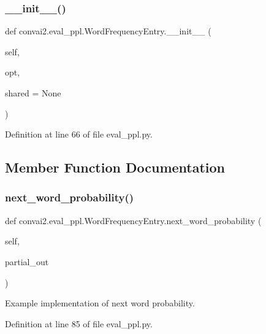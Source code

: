 \subsubsection{\texorpdfstring{\+\_\+\+\_\+init\+\_\+\+\_\+()}{\_\_init\_\_()}}
{\footnotesize\ttfamily def convai2.\+eval\+\_\+ppl.\+Word\+Frequency\+Entry.\+\_\+\+\_\+init\+\_\+\+\_\+ (\begin{DoxyParamCaption}\item[{}]{self,  }\item[{}]{opt,  }\item[{}]{shared = {\ttfamily None} }\end{DoxyParamCaption})}



Definition at line 66 of file eval\+\_\+ppl.\+py.



\subsection{Member Function Documentation}
\mbox{\label{classconvai2_1_1eval__ppl_1_1WordFrequencyEntry_a8dace8d727764609e2cc305e79fab2a5}} 
\subsubsection{\texorpdfstring{next\+\_\+word\+\_\+probability()}{next\_word\_probability()}}
{\footnotesize\ttfamily def convai2.\+eval\+\_\+ppl.\+Word\+Frequency\+Entry.\+next\+\_\+word\+\_\+probability (\begin{DoxyParamCaption}\item[{}]{self,  }\item[{}]{partial\+\_\+out }\end{DoxyParamCaption})}

\begin{DoxyVerb}Example implementation of next word probability.\end{DoxyVerb}
 

Definition at line 85 of file eval\+\_\+ppl.\+py.



